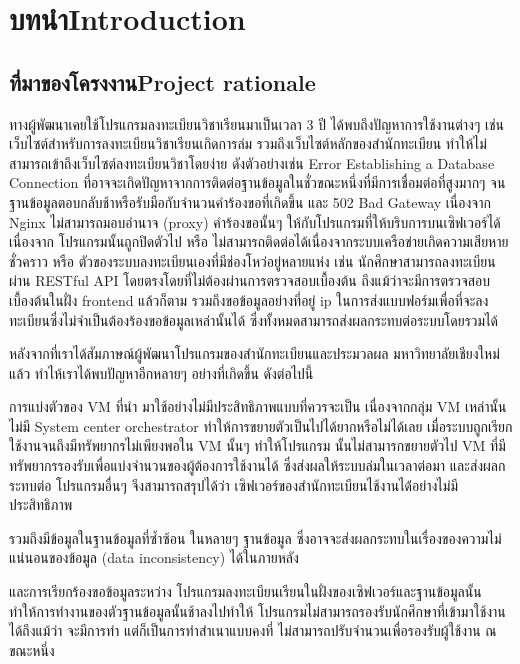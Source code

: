 \chapter{\ifcpe บทนำ\else Introduction\fi}

\section{\ifcpe ที่มาของโครงงาน\else Project rationale\fi}

ทางผู้พัฒนาเคยใช้โปรแกรมลงทะเบียนวิชาเรียนมาเป็นเวลา 3 ปี ได้พบถึงปัญหาการใช้งานต่างๆ เช่น เว็บไซต์สำหรับการลงทะเบียนวิชาเรียนเกิดการล่ม 
รวมถึงเว็บไซต์หลักของสำนักทะเบียน ทำให้ไม่สามารถเข้าถึงเว็บไซต์ลงทะเบียนวิชาโดยง่าย ดังตัวอย่างเช่น Error Establishing a Database Connection ที่อาจจะเกิดปัญหาจากการติดต่อฐานข้อมูลในชั่วขณะหนึ่งที่มีการเชื่อมต่อที่สูงมากๆ จนฐานข้อมูลตอบกลับช้าหรือรับมือกับจำนวนคำร้องขอที่เกิดขึ้น และ 502 Bad Gateway เนื่องจาก Nginx ไม่สามารถมอบอำนาจ (proxy) คำร้องขอนั้นๆ ให้กับโปรแกรมที่ให้บริบการบนเซิฟเวอร์ได้เนื่องจาก โปรแกรมนั้นถูกปิดตัวไป หรือ ไม่สามารถติดต่อได้เนื่องจากระบบเครือข่ายเกิดความเสียหายชั่วคราว หรือ ตัวของระบบลงทะเบียนเองที่มีช่องโหว่อยู่หลายแห่ง เช่น นักศึกษาสามารถลงทะเบียนผ่าน RESTful API โดยตรงโดยที่ไม่ต้องผ่านการตรวจสอบเบื้องต้น ถึงแม้ว่าจะมีการตรวจสอบเบื้องต้นในฝั่ง frontend แล้วก็ตาม รวมถึงขอข้อมูลอย่างที่อยู่ ip ในการส่งแบบฟอร์มเพื่อที่จะลงทะเบียนซึ่งไม่จำเป็นต้องร้องขอข้อมูลเหล่านั้นได้ ซึ่งทั้งหมดสามารถส่งผลกระทบต่อระบบโดยรวมได้

หลังจากที่เราได้สัมภาษณ์ผู้พัฒนาโปรแกรมของสำนักทะเบียนและประมวลผล มหาวิทยาลัยเชียงใหม่แล้ว ทำไห้เราได้พบปัญหาอีกหลายๆ อย่างที่เกิดขึ้น ดังต่อไปนี้

การแบ่งตัวของ VM \cite{vm} ที่นำ มาใช้อย่างไม่มีประสิทธิภาพแบบที่ควรจะเป็น
เนื่องจากกลุ่ม VM เหล่านั้นไม่มี System center orchestrator \cite{sco} ทำให้การขยายตัวเป็นไปได้ยากหรือไม่ได้เลย เมื่อระบบถูกเรียกใช้งานจนถึงมีทรัพยากรไม่เพียงพอใน VM นั้นๆ ทำให้โปรแกรม นั้นไม่สามารกขยายตัวไป VM ที่มีทรัพยากรรองรับเพื่อแบ่งจำนวนของผู้ต้องการใช้งานได้ ซึ่งส่งผลให้ระบบล่มในเวลาต่อมา และส่งผลกระทบต่อ โปรแกรมอื่นๆ 
 จึงสามารถสรุปได้ว่า เซิฟเวอร์ของสำนักทะเบียนไช้งานได้่อย่างไม่มีประสิทธิภาพ

รวมถึงมีข้อมูลในฐานข้อมูลที่ซ้ำซ้อน ในหลายๆ ฐานข้อมูล ซึ่งอาจจะส่งผลกระทบในเรื่องของความไม่แน่นอนของข้อมูล (data inconsistency) ได้ในภายหลัง

และการเรียกร้องขอข้อมูลระหว่าง โปรแกรมลงทะเบียนเรียนในฝั่งของเซิฟเวอร์และฐานข้อมูลนั้น ทำให้การทำงานของตัวฐานข้อมูลนั้นช้าลงไปทำให้ โปรแกรมไม่สามารถรองรับนักศึกษาที่เข้ามาใช้งานได้ถึงแม้ว่า จะมีการทำ แต่ก็เป็นการทำสำเนาแบบคงที่ ไม่สามารถปรับจำนวนเพื่อรองรับผู้ใช้งาน ณ ขณะหนึ่ง

